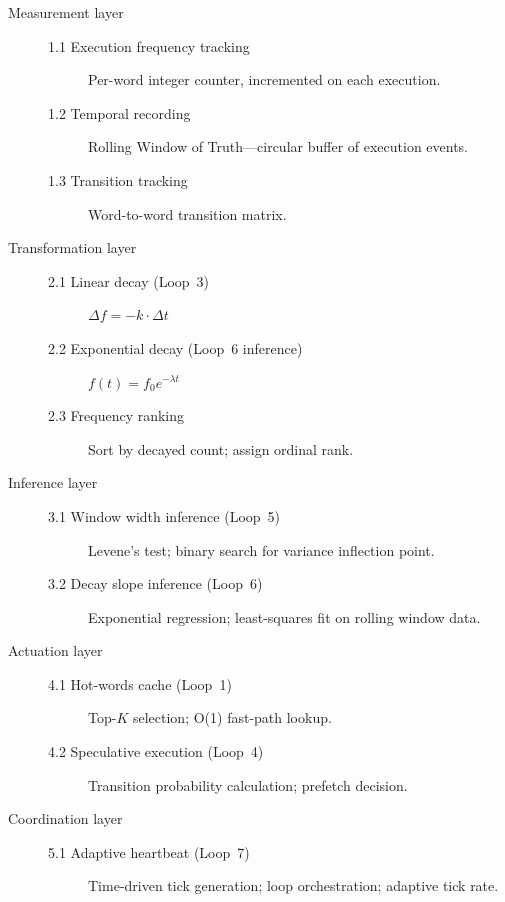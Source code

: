 \begin{description}
  \item[Measurement layer]
    \begin{description}
      \item[1.1 Execution frequency tracking] Per-word integer counter,
        incremented on each execution.
      \item[1.2 Temporal recording] Rolling Window of Truth---circular buffer
        of execution events.
      \item[1.3 Transition tracking] Word-to-word transition matrix.
    \end{description}

  \item[Transformation layer]
    \begin{description}
      \item[2.1 Linear decay (Loop~3)] $\Delta f = -k \cdot \Delta t$
      \item[2.2 Exponential decay (Loop~6 inference)] $f(t) = f_0 e^{-\lambda t}$
      \item[2.3 Frequency ranking] Sort by decayed count; assign ordinal rank.
    \end{description}

  \item[Inference layer]
    \begin{description}
      \item[3.1 Window width inference (Loop~5)] Levene's test; binary search
        for variance inflection point.
      \item[3.2 Decay slope inference (Loop~6)] Exponential regression;
        least-squares fit on rolling window data.
    \end{description}

  \item[Actuation layer]
    \begin{description}
      \item[4.1 Hot-words cache (Loop~1)] Top-$K$ selection; O(1) fast-path
        lookup.
      \item[4.2 Speculative execution (Loop~4)] Transition probability
        calculation; prefetch decision.
    \end{description}

  \item[Coordination layer]
    \begin{description}
      \item[5.1 Adaptive heartbeat (Loop~7)] Time-driven tick generation;
        loop orchestration; adaptive tick rate.
    \end{description}
\end{description}

